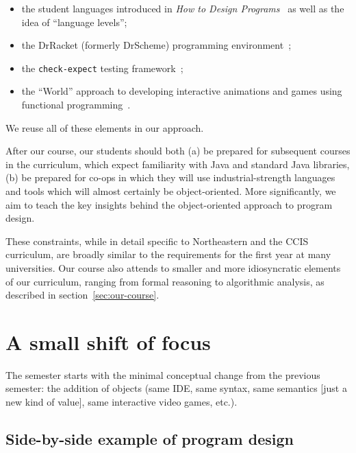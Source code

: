 \documentclass[submission,copyright]{eptcs}
\begin{document}
\begin{itemize}
  \item the student languages introduced in \emph{How to Design
    Programs}~\cite{dvanhorn:Felleisen2004Structure,
    dvanhorn:Felleisen2001How} as well as the idea of ``language levels'';

  \item the DrRacket (formerly DrScheme) 
    programming environment~\cite{dvanhorn:Findler2002DrScheme};

  \item the \texttt{check-expect} testing framework~\cite{local:check-expect};

  \item the ``World'' approach to developing interactive animations
    and games using functional
    programming~\cite{dvanhorn:Felleisen2009Functional}.
\end{itemize}

\noindent
We reuse all of these elements in our approach.

After our course, our students should both (a) be prepared for
subsequent courses in the curriculum, which expect familiarity with
Java and standard Java libraries, (b) be prepared for co-ops in which
they will use industrial-strength languages and tools which will
almost certainly be object-oriented.  More significantly, we aim to
teach the key insights behind the object-oriented approach to program
design.

These constraints, while in detail specific to Northeastern and the
CCIS curriculum, are broadly similar to the requirements for the first
year at many universities.  Our course also attends to smaller and
more idiosyncratic elements of our curriculum, ranging from formal
reasoning to algorithmic analysis, as described in
section~\ref{sec:our-course}.



\section{A small shift of focus}

The semester starts with the minimal conceptual change from the
previous semester: the addition of objects (same IDE, same syntax,
same semantics [just a new kind of value], same interactive video
games, etc.).

\subsection{Side-by-side example of program design}
\end{document}
